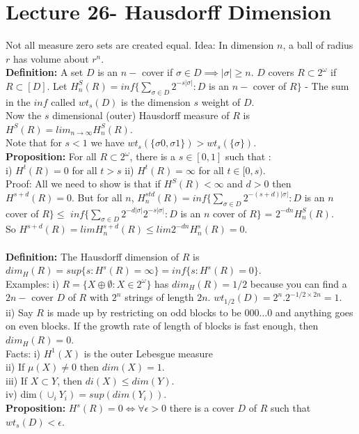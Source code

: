 \documentclass{article}
\begin{document}
   \section{Lecture 26- Hausdorff Dimension}
   Not all measure zero sets are created equal. 
   Idea: In dimension $n$, a ball of radius $r$ has volume about $r^n$. \\
   \textbf{Definition:} A set $D$ is an $n-$ cover if $ \sigma \in D \implies |\sigma| \geq n$. $D$ covers $R \subset 2^\omega$ if $R \subset [D]$. Let $H_n^S(R) = inf \{\sum_{\sigma \in D} 2^{-s|\sigma|} : D$ is an $n-$ cover of $R \}$ - The sum in the $inf$ called $wt_s(D)$ is the  dimension $s$ weight of $D$.\\
   Now the $s$ dimensional (outer) Hausdorff measure of $R$ is $H^S(R) = lim_{n \to \infty} H^S_n(R)$.\\
   Note that for $s < 1$ we have $wt_s(\{\sigma 0 , \sigma 1\}) > wt_s(\{\sigma\})$.\\
   \textbf{Proposition:} For all $R \subset2^\omega$, there is a $s \in [0,1]$ such that :\\
   i) $H^t(R) = 0$ for all $t > s$ ii) $H^t(R) = \infty$ for all $t \in [0,s)$.\\
   Proof: All we need to show is that if $H^S(R) < \infty$ and $d > 0$ then $H^{s+d}(R) = 0$. But for all $n$, $H_n^{std}(R) = inf \{\sum_{\sigma \in D} 2^{-(s+d)|\sigma|}: D$ is an $n$ cover of $R\} \leq $ $ inf \{\sum_{\sigma \in D} 2^{-d|\sigma|} 2^{-s |\sigma|}: D$ is an $n$ cover of $R\}$ = $2^{-dn} H^S_n(R)$.\\
   So $H^{s+d}(R) = lim H_n^{s+d}(R) \leq lim 2^{-dn} H_n^s(R) = 0$.\\\\
   \textbf{Definition:} The Hausdorff dimension of $R$ is $dim_H(R) = sup\{s: H^s(R) = \infty\} = inf \{s : H^s(R) = 0\}$.\\
   Examples: i) $R = \{X \oplus \emptyset : X \in 2^\omega\}$ has $dim_H(R) = 1/2$ because you can find a $2n-$ cover  $D$ of $R$ with $2^n$ strings of length $2n$. $wt_{1/2}(D) = 2^n. 2^{-1/2 \times 2n} = 1$. \\
   ii) Say $R$ is made up by restricting on odd blocks to be $000...0$ and anything goes on even blocks. If the growth rate of length of blocks is fast enough, then $dim_H(R) = 0$. 
   \\
   Facts: i) $H^1(X)$ is the outer Lebesgue measure\\
   ii) If $\mu(X) \neq 0 $ then $dim(X) = 1$.\\
   iii) If $X \subset  Y$, then $di(X) \leq dim(Y)$.\\
   iv) dim$(\cup_i Y_i) = sup ( dim(Y_i))$.\\
   \textbf{Proposition:} $H^s(R) = 0 \iff \forall \epsilon>0$ there is a cover $D$ of $R$ such that $wt_s(D) < \epsilon$.
\end{document}
